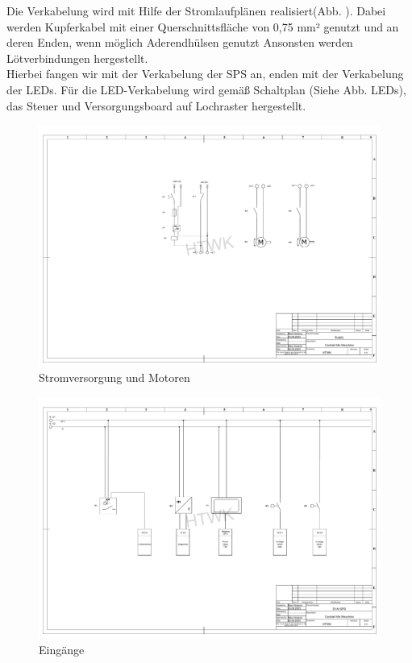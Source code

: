 \documentclass[10pt,a4paper]{report}
\begin{document}
	Die Verkabelung wird mit Hilfe der Stromlaufplänen realisiert(Abb.  ). Dabei werden Kupferkabel mit einer Querschnittsfläche von 0,75 mm² genutzt und an deren Enden, wenn möglich Aderendhülsen genutzt Ansonsten werden Lötverbindungen hergestellt.\\
	Hierbei fangen wir mit der Verkabelung der SPS an, enden mit der Verkabelung der LEDs. Für die LED-Verkabelung wird gemäß Schaltplan (Siehe Abb. LEDs), das Steuer und Versorgungsboard auf Lochraster hergestellt.
	\begin{figure}[htb]
		\includegraphics[width=1\textwidth]{Supply (V2) .pdf}
		\centering
		\caption{Stromversorgung und Motoren}
	\end{figure}
	\begin{figure}[htb]
	\includegraphics[width=1\textwidth]{DI AI (V2).pdf}
	\centering
	\caption{Eingänge}
	\end{figure}
\end{document}
